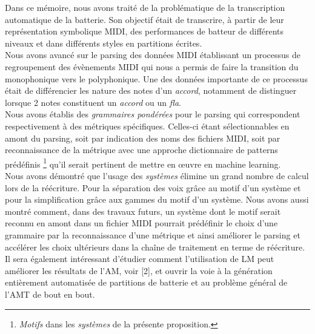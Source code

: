 Dans ce mémoire, nous avons traité de la problématique de la transcription automatique de la batterie. Son objectif était de transcrire, à partir de leur représentation symbolique MIDI, des performances de batteur de différents niveaux et dans différents styles en partitions écrites.\\
Nous avons avancé sur le parsing des données MIDI établissant un processus de regroupement des évènements MIDI qui nous a permis de faire la transition du monophonique vers le polyphonique. Une des données importante de ce processus était de différencier les nature des notes d’un \textit{accord}, notamment de distinguer lorsque 2 notes constituent un \textit{accord} ou un \textit{fla}.\\
Nous avons établis des \textit{grammaires pondérées} pour le parsing qui correspondent respectivement à des métriques spécifiques. Celles-ci étant sélectionnables en amont du parsing, soit par indication des noms des fichiers MIDI, soit par reconnaissance de la métrique avec une approche dictionnaire de patterns prédéfinis \footnote{\textit{Motifs} dans les \textit{systèmes} de la présente proposition.} qu’il serait pertinent de mettre en œuvre en machine learning.\\
Nous avons démontré que l’usage des \textit{systèmes} élimine un grand nombre de calcul lors de la réécriture. Pour la séparation des voix grâce au motif d’un système et pour la simplification grâce aux gammes du motif d’un système. Nous avons aussi montré comment, dans des travaux futurs, un système dont le motif serait reconnu en amont dans un fichier MIDI pourrait prédéfinir le choix d’une grammaire par la reconnaissance d’une métrique et ainsi améliorer le parsing et accélérer les choix ultérieurs dans la chaîne de traitement en terme de réécriture.\\
Il sera également intéressant d'étudier comment l'utilisation de LM peut améliorer les résultats de l'AM, voir [2], et ouvrir la voie à la génération entièrement automatisée de partitions de batterie et au problème général de l'AMT de bout en bout.\cite{8350302}